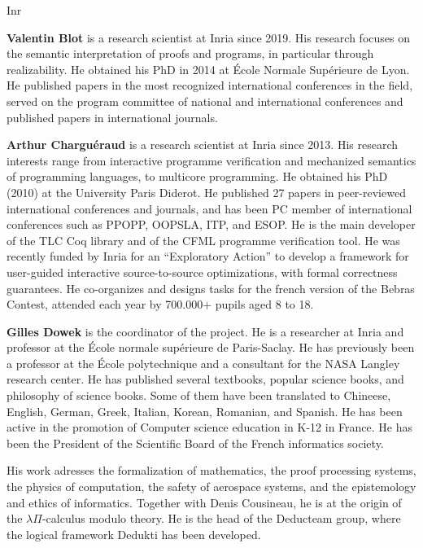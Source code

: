 \begin{sitedescription}{Inr}
\begin{compactitem}
\item{\bf Valentin Blot} is a research scientist at Inria since 2019. His research focuses on the semantic interpretation of proofs and programs, in particular through realizability. He obtained his PhD in 2014 at \'Ecole Normale Sup\'erieure de Lyon. He published papers in the most recognized international conferences in the field, served on the program committee of national and international conferences and published papers in international journals.

\item{\bf Arthur Charguéraud} is a research scientist at Inria since 2013.
His research interests range from interactive programme verification and mechanized
semantics of programming languages, to multicore programming.
He obtained his PhD (2010) at the University Paris Diderot. He published 27 papers
in peer-reviewed international conferences and journals, and has been PC member
of international conferences such as PPOPP, OOPSLA, ITP, and ESOP. He is the main
developer of the TLC Coq library and of the CFML programme verification tool.
He was recently funded by Inria for an ``Exploratory Action'' to develop a framework
for user-guided interactive source-to-source optimizations, with formal correctness
guarantees.
He co-organizes and designs tasks for the french version of the Bebras Contest,
attended each year by 700.000+ pupils aged 8 to 18.


\item{\bf Gilles Dowek} is the coordinator of the project.
He is a researcher at Inria and professor at the École
normale supérieure de Paris-Saclay. He has previously been a professor
at the École polytechnique and a consultant for the NASA Langley
research center. He has published several textbooks, popular science
books, and philosophy of science books. Some of them have been
translated to Chineese, English, German, Greek, Italian, Korean,
Romanian, and Spanish. He has been active in the promotion of
Computer science education in K-12 in France. He has been the
President of the Scientific Board of the French informatics society.

His work adresses the formalization of mathematics, the proof
processing systems, the physics of computation, the safety of
aerospace systems, and the epistemology and ethics of informatics.
Together with Denis Cousineau, he is at the origin of the
$\lambda\Pi$-calculus modulo theory. He is the head of the Deducteam
group, where the logical framework Dedukti has been developed.


\end{compactitem}
\end{sitedescription}
